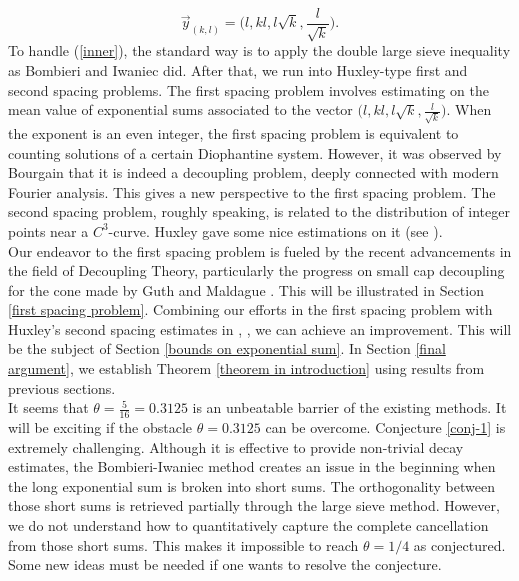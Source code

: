 \documentclass[11pt]{amsart}
\numberwithin{equation}{section}
\theoremstyle{definition}
\theoremstyle{proposition}
\begin{document}
\[
\Vec{y}_{(k,l)}=\Big(l,kl,l\sqrt{k},\frac{l}{\sqrt{k}}\Big).
\]
To handle (\ref{inner}), the standard way is to apply the double large sieve inequality as Bombieri and Iwaniec did. 
After that, we run into Huxley-type first and second spacing problems. The first spacing problem involves estimating on the mean value of exponential sums associated to the vector $\Big(l,kl,l\sqrt{k},\frac{l}{\sqrt{k}}\Big)$.  When the exponent is an even integer, the first spacing problem is equivalent to counting solutions of a certain Diophantine system. However, it was observed by Bourgain  that it is indeed a decoupling problem, deeply connected with modern Fourier analysis.  
This gives a new perspective to the first spacing problem. 
The second spacing problem, roughly speaking,  is related to the distribution of integer points near a $C^3$-curve. Huxley gave some nice estimations on it (see \cite{Huxley03}).   \\

Our endeavor to the first spacing problem is fueled by the recent advancements in the field of Decoupling Theory, particularly the progress on small cap decoupling for the cone made by Guth and Maldague \cite{GuthMaldague}. This will be illustrated in Section \ref{first spacing problem}. Combining our efforts in the first spacing problem with Huxley's second spacing estimates  in \cite{Huxley1996}, \cite{Huxley03}, we can achieve an improvement. This will be the subject of Section \ref{bounds on exponential sum}. In Section \ref{final argument}, we establish Theorem \ref{theorem in introduction} using results from previous sections.\\

It seems that $\theta=\frac{5}{16}=0.3125$ is an unbeatable barrier of the existing methods.  
It will be exciting if the obstacle $\theta=0.3125$ can be overcome.  Conjecture \ref{conj-1} is extremely challenging. Although it is effective to provide non-trivial decay estimates, the Bombieri-Iwaniec method creates an issue in the beginning when the long exponential sum is broken into short sums. The orthogonality between those short sums is retrieved partially through the large sieve method. However, we do not understand how to quantitatively capture the complete cancellation from those short sums. This makes it impossible to reach $\theta=1/4$  as conjectured.  Some new ideas must be needed if one wants to resolve the conjecture. \\
\end{document}
